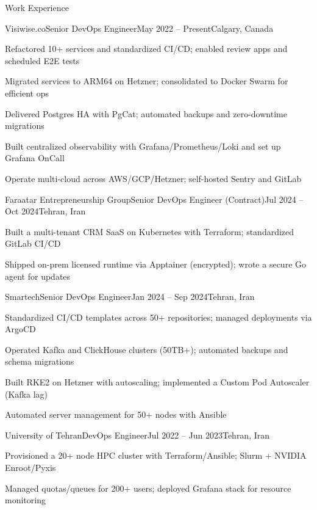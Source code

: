 \documentclass[]{main}
\begin{document}
\begin{section}{Work Experience}
 \begin{subsection}{Visiwise.co}{Senior DevOps Engineer}{May 2022 -- Present}{Calgary, Canada}
     \item Refactored 10+ services and standardized CI/CD; enabled review apps and scheduled E2E tests
     \item Migrated services to ARM64 on Hetzner; consolidated to Docker Swarm for efficient ops
     \item Delivered Postgres HA with PgCat; automated backups and zero-downtime migrations
     \item Built centralized observability with Grafana/Prometheus/Loki and set up Grafana OnCall
     \item Operate multi-cloud across AWS/GCP/Hetzner; self-hosted Sentry and GitLab
 \end{subsection}
 \begin{subsection}{Faraatar Entrepreneurship Group}{Senior DevOps Engineer (Contract)}{Jul 2024 -- Oct 2024}{Tehran, Iran}
     \item Built a multi-tenant CRM SaaS on Kubernetes with Terraform; standardized GitLab CI/CD
     \item Shipped on-prem licensed runtime via Apptainer (encrypted); wrote a secure Go agent for updates
 \end{subsection}
 \begin{subsection}{Smartech}{Senior DevOps Engineer}{Jan 2024 -- Sep 2024}{Tehran, Iran}
     \item Standardized CI/CD templates across 50+ repositories; managed deployments via ArgoCD
     \item Operated Kafka and ClickHouse clusters (50TB+); automated backups and schema migrations
     \item Built RKE2 on Hetzner with autoscaling; implemented a Custom Pod Autoscaler (Kafka lag)
     \item Automated server management for 50+ nodes with Ansible
 \end{subsection}
 \begin{subsection}{University of Tehran}{DevOps Engineer}{Jul 2022 -- Jun 2023}{Tehran, Iran}
     \item Provisioned a 20+ node HPC cluster with Terraform/Ansible; Slurm + NVIDIA Enroot/Pyxis
     \item Managed quotas/queues for 200+ users; deployed Grafana stack for resource monitoring
 \end{subsection}

\end{section}
\end{document}
